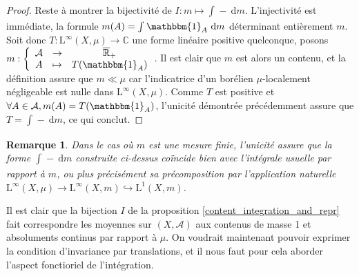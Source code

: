 \documentclass[a4paper,12pt]{article}
\newtheorem{remark}[theorem]{Remarque}
\newcommand{\R}{\mathbb{R}}
\newcommand{\C}{\mathbb{C}}
\newcommand{\indic}{\mathbbm{1}}
\newcommand{\integral}[4]{\int_{#1}^{#2} #3~\mathrm{d}#4}
\newcommand\fundef[3]{#1: \left\{\begin{array}{ccc}#2\\#3\end{array}\right.}
\newcommand{\closure}[1]{\overline{#1}}
\newcommand{\blank}{{-}}
\newcommand{\TODO}[1]{}%
\begin{document}
\begin{proof}
    Reste à montrer la bijectivité de $I:m\mapsto \integral{}{}{\blank}{m}$. L'injectivité est immédiate, la formule $m(A) = \integral{}{}{\indic_A}{m}$ déterminant
    entièrement $m$. Soit donc $T : \mathrm{L}^\infty(X, \mu)\to\C$ une forme linéaire positive quelconque, posons $\fundef{m}{\mathcal{A}&\to&\closure{\R}_+}{A&\mapsto&T(\indic_A)}$.
    Il est clair que $m$ est alors un contenu, et la définition assure que $m\ll\mu$ car l'indicatrice d'un borélien $\mu$-localement négligeable
    est nulle dans $\mathrm{L}^\infty(X,\mu)$. Comme $T$ est positive et $\forall A\in\mathcal{A}, m(A)=T(\indic_A)$, l'unicité 
    démontrée précédemment assure que $T = \integral{}{}{\blank}{m}$, ce qui conclut.
\end{proof}

\TODO{Commentaire sur lien avec construction de l'intégrale de Bochner ?}

\begin{remark}
    Dans le cas où $m$ est une mesure finie, l'unicité assure que la forme $\integral{}{}{\blank}{m}$ construite ci-dessus coïncide bien avec l'intégrale usuelle
    par rapport à $m$, ou plus précisément sa précomposition
    par l'application naturelle $\mathrm{L}^\infty(X, \mu)\to\mathrm{L}^\infty(X, m)\hookrightarrow\mathrm{L}^1(X, m)$.
\end{remark}

Il est clair que la bijection $I$ de la proposition \ref{content_integration_and_repr} fait correspondre les moyennes 
sur $(X, \mathcal{A})$ aux contenus de masse 1 et absoluments continus par rapport à $\mu$. On voudrait maintenant pouvoir exprimer 
la condition d'invariance par translations, et il nous faut pour cela aborder l'aspect fonctioriel de l'intégration.
\end{document}
